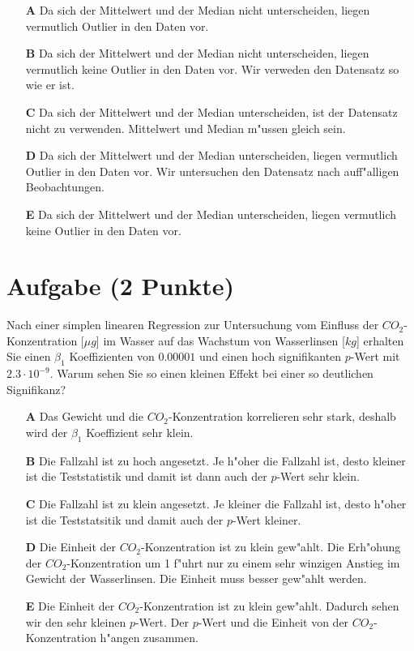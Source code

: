 \documentclass[a4paper, 10pt]{scrartcl}\usepackage[]{graphicx}\usepackage[]{xcolor}
\begin{document}
\begin{enumerate}
\item [\textbf{A} \msquare] Da sich der Mittelwert und der Median nicht unterscheiden, liegen vermutlich Outlier in den Daten vor.
\item [\textbf{B} \msquare] Da sich der Mittelwert und der Median nicht unterscheiden, liegen vermutlich keine Outlier in den Daten vor. Wir verweden den Datensatz so wie er ist.
\item [\textbf{C} \msquare] Da sich der Mittelwert und der Median unterscheiden, ist der Datensatz nicht zu verwenden. Mittelwert und Median m{"u}ssen gleich sein.
\item [\textbf{D} \msquare] Da sich der Mittelwert und der Median unterscheiden, liegen vermutlich Outlier in den Daten vor. Wir untersuchen den Datensatz nach auff{"a}lligen Beobachtungen.
\item [\textbf{E} \msquare] Da sich der Mittelwert und der Median unterscheiden, liegen vermutlich keine Outlier in den Daten vor.
\end{enumerate} 

\section{Aufgabe \hfill (2 Punkte)}

Nach einer simplen linearen Regression zur Untersuchung vom Einfluss der
$CO_2$-Konzentration [$\mu g$] im Wasser auf das Wachstum von Wasserlinsen
[$kg$] erhalten Sie einen $\beta_1$ Koeffizienten von $0.00001$ und einen
hoch signifikanten $p$-Wert mit $2.3\cdot 10^{-9}$. Warum sehen Sie so einen kleinen
Effekt bei einer so deutlichen Signifikanz? 




\begin{enumerate}
\item [\textbf{A} \msquare] Das Gewicht und die $CO_2$-Konzentration korrelieren sehr stark, deshalb wird der $\beta_1$ Koeffizient sehr klein.
\item [\textbf{B} \msquare] Die Fallzahl ist zu hoch angesetzt. Je h{"o}her die Fallzahl ist, desto kleiner ist die Teststatistik und damit ist dann auch der $p$-Wert sehr klein.
\item [\textbf{C} \msquare] Die Fallzahl ist zu klein angesetzt. Je kleiner die Fallzahl ist, desto h{"o}her ist die Teststatsitik und damit auch der $p$-Wert kleiner. 
\item [\textbf{D} \msquare] Die Einheit der $CO_2$-Konzentration ist zu klein gew{"a}hlt. Die Erh{"o}hung der $CO_2$-Konzentration um 1 f{"u}hrt nur zu einem sehr winzigen Anstieg im Gewicht der Wasserlinsen. Die Einheit muss besser gew{"a}hlt werden.
\item [\textbf{E} \msquare] Die Einheit der $CO_2$-Konzentration ist zu klein gew{"a}hlt. Dadurch sehen wir den sehr kleinen $p$-Wert. Der $p$-Wert und die Einheit von der $CO_2$-Konzentration h{"a}ngen zusammen.
\end{enumerate} 
\end{document}
